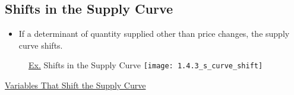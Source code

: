 \newpage
	
\subsection{Shifts in the Supply Curve}

	\begin{itemize}
	
	\item If a determinant of quantity supplied other than price changes, the supply curve shifts.
	
	\end{itemize}
	
	\begin{figure}[h]
	\underline{Ex.} Shifts in the Supply Curve
	\centering
	\texttt{[image: 1.4.3\_s\_curve\_shift]}
	\end{figure}
	
	\underline{Variables That Shift the Supply Curve}
	
